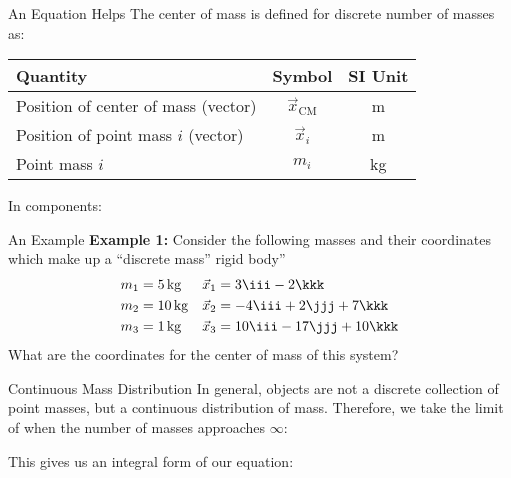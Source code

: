 \documentclass[12pt,compress,aspectratio=169]{beamer}
\begin{document}
\begin{frame}{An Equation Helps}
  The center of mass is defined for discrete number of masses as:

  \begin{center}
    \begin{tabular}{l|c|c}
      \rowcolor{pink}
      \textbf{Quantity} & \textbf{Symbol} & \textbf{SI Unit} \\ \hline
      Position of center of mass (vector) & $\vec x_\text{CM}$ & \si\metre \\
      Position of point mass $i$ (vector) & $\vec x_i$ & \si\metre \\
      Point mass $i$ & $m_i$ & \si{\kilo\gram}
    \end{tabular}
  \end{center}
  In components:

\end{frame}


\begin{frame}{An Example}
  \textbf{Example 1:} Consider the following masses and their coordinates
  which make up a ``discrete mass'' rigid body''
  \begin{align*}
    m_1&=\SI{5.}{\kg} &\vec x_1&=3\iii-2\kkk\\
    m_2&=\SI{10.}{\kg}&\vec x_2&=-4\iii+2\jjj+7\kkk\\
    m_3&=\SI{1.}{\kg}&\vec x_3&=10\iii-17\jjj+10\kkk
  \end{align*}
  What are the coordinates for the center of mass of this system?
\end{frame}



\begin{frame}{Continuous Mass Distribution}
  In general, objects are not a discrete collection of point masses, but a
  continuous distribution of mass. Therefore, we take the limit of when the
  number of masses approaches $\infty$:
  

  This gives us an integral form of our equation:

\end{frame}
\end{document}
